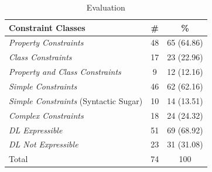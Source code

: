 \documentclass{llncs}
\begin{document}
\begin{table}
  \vspace{0cm}
	\centering
		\begin{tabular}{l|c|c}
      \textbf{Constraint Classes} & \textbf{\#} & \textbf{\%} \\
      \hline
\emph{Property Constraints} & 48 & 65 (64.86) \\
\emph{Class Constraints} & 17 & 23 (22.96) \\
\emph{Property and Class Constraints} & 9 & 12 (12.16) \\
\hline
\emph{Simple Constraints} & 46 & 62 (62.16) \\
\emph{Simple Constraints} (Syntactic Sugar) & 10 & 14 (13.51) \\
\emph{Complex Constraints} & 18 & 24 (24.32) \\
\hline
\emph{DL Expressible} & 51 & 69 (68.92) \\
\emph{DL Not Expressible} & 23 & 31 (31.08) \\
\hline
Total & 74 & 100 \\
		\end{tabular}
	\caption{Evaluation}
	\label{tab:evaluation}
\end{table}

%
\end{document}
